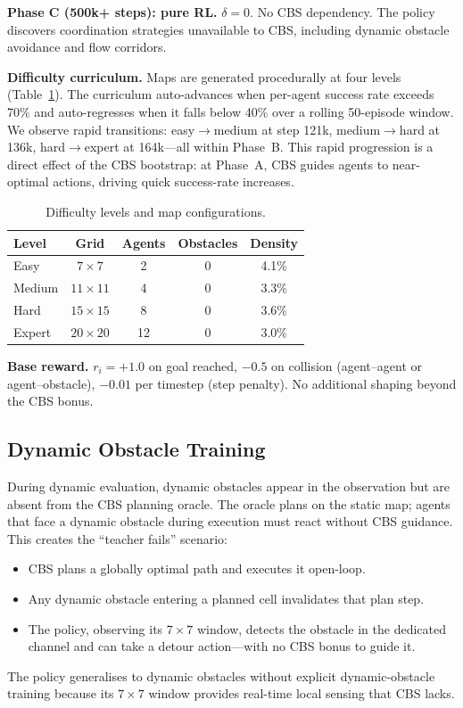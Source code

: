 \documentclass[letterpaper,twocolumn,10pt]{article}
\begin{document}
\textbf{Phase C (500k+ steps): pure RL.}
$\delta = 0$. No CBS dependency. The policy discovers coordination strategies
unavailable to CBS, including dynamic obstacle avoidance and flow corridors.

\textbf{Difficulty curriculum.}
Maps are generated procedurally at four levels (Table~\ref{tab:levels}). The curriculum
auto-advances when per-agent success rate exceeds 70\% and auto-regresses when it
falls below 40\% over a rolling 50-episode window. We observe rapid transitions:
easy$\to$medium at step 121k, medium$\to$hard at 136k, hard$\to$expert at 164k---all
within Phase~B. This rapid progression is a direct effect of the CBS bootstrap: at
Phase~A, CBS guides agents to near-optimal actions, driving quick success-rate
increases.

\begin{table}[t]
\centering
\caption{Difficulty levels and map configurations.}
\label{tab:levels}
\small
\begin{tabular}{lcccc}
\toprule
Level  & Grid         & Agents & Obstacles & Density \\
\midrule
Easy   & $7\times7$   & 2      & 0         & 4.1\%   \\
Medium & $11\times11$ & 4      & 0         & 3.3\%   \\
Hard   & $15\times15$ & 8      & 0         & 3.6\%   \\
Expert & $20\times20$ & 12     & 0         & 3.0\%   \\
\bottomrule
\end{tabular}
\end{table}

\textbf{Base reward.}
$r_i = +1.0$ on goal reached, $-0.5$ on collision (agent--agent or agent--obstacle),
$-0.01$ per timestep (step penalty). No additional shaping beyond the CBS bonus.

\subsection{Dynamic Obstacle Training}

During dynamic evaluation, dynamic obstacles appear in the observation but are absent
from the CBS planning oracle. The oracle plans on the static map; agents that face
a dynamic obstacle during execution must react without CBS guidance. This creates the
``teacher fails'' scenario:
\begin{itemize}[leftmargin=*,itemsep=2pt,topsep=2pt]
  \item CBS plans a globally optimal path and executes it open-loop.
  \item Any dynamic obstacle entering a planned cell invalidates that plan step.
  \item The policy, observing its $7\times 7$ window, detects the obstacle in the
    dedicated channel and can take a detour action---with no CBS bonus to guide it.
\end{itemize}
The policy generalises to dynamic obstacles without explicit dynamic-obstacle training
because its $7\times 7$ window provides real-time local sensing that CBS lacks.
\end{document}
